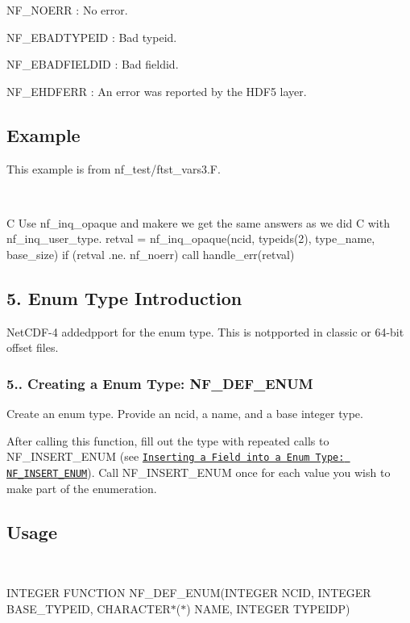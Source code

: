 {\ttfamily N\+F\+\_\+\+N\+O\+E\+RR} \+: No error.

{\ttfamily N\+F\+\_\+\+E\+B\+A\+D\+T\+Y\+P\+E\+ID} \+: Bad typeid.

{\ttfamily N\+F\+\_\+\+E\+B\+A\+D\+F\+I\+E\+L\+D\+ID} \+: Bad fieldid.

{\ttfamily N\+F\+\_\+\+E\+H\+D\+F\+E\+RR} \+: An error was reported by the H\+D\+F5 layer.

\subsection*{Example }

This example is from nf\+\_\+test/ftst\+\_\+vars3.\+F.

 

C Use nf\+\_\+inq\+\_\+opaque and makere we get the same answers as we did C with nf\+\_\+inq\+\_\+user\+\_\+type. retval = nf\+\_\+inq\+\_\+opaque(ncid, typeids(2), type\+\_\+name, base\+\_\+size) if (retval .ne. nf\+\_\+noerr) call handle\+\_\+err(retval)

\subsection*{5. Enum Type Introduction }

Net\+C\+D\+F-\/4 addedpport for the enum type. This is notpported in classic or 64-\/bit offset files.

\subsubsection*{5.. Creating a Enum Type\+: N\+F\+\_\+\+D\+E\+F\+\_\+\+E\+N\+UM}

Create an enum type. Provide an ncid, a name, and a base integer type.

After calling this function, fill out the type with repeated calls to N\+F\+\_\+\+I\+N\+S\+E\+R\+T\+\_\+\+E\+N\+UM (see \href{#NF_005fINSERT_005fENUM}{\tt Inserting a Field into a Enum Type\+: N\+F\+\_\+\+I\+N\+S\+E\+R\+T\+\_\+\+E\+N\+UM}). Call N\+F\+\_\+\+I\+N\+S\+E\+R\+T\+\_\+\+E\+N\+UM once for each value you wish to make part of the enumeration.

\subsection*{Usage }

 

I\+N\+T\+E\+G\+ER F\+U\+N\+C\+T\+I\+ON N\+F\+\_\+\+D\+E\+F\+\_\+\+E\+N\+UM(I\+N\+T\+E\+G\+ER N\+C\+ID, I\+N\+T\+E\+G\+ER B\+A\+S\+E\+\_\+\+T\+Y\+P\+E\+ID, C\+H\+A\+R\+A\+C\+T\+E\+R$\ast$($\ast$) N\+A\+ME, I\+N\+T\+E\+G\+ER T\+Y\+P\+E\+I\+DP)

